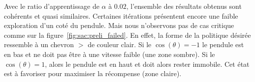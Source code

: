 Avec le ratio d'apprentissage de \(\alpha\) à $0.02$, l'ensemble des résultats obtenus sont cohérents et quasi similaires. Certaines itérations présentent encore une faible exploration d'un coté du pendule. Mais nous n'observons pas de cas critique comme sur la figure~\ref{fig:sac:preli_failed}. En effet, la forme de la politique désirée ressemble à un chevron \(>\) de couleur clair. Si le \(\cos(\theta) = -1\) le pendule est en bas et ne doit pas être à une vitesse faible (une zone sombre). Si le \(\cos(\theta) = 1\), alors le pendule est en haut et doit alors rester immobile. Cet état est à favoriser pour maximiser la récompense (zone claire).
